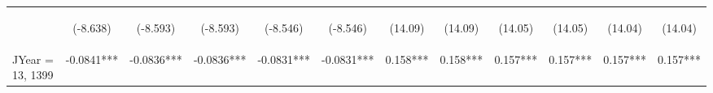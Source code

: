 \documentclass[]{article}
\begin{document}
\begin{center}
\begin{tabular}{lccccccccccc}
        \vspace{4pt}     & \begin{footnotesize}(-8.638)\end{footnotesize} & \begin{footnotesize}(-8.593)\end{footnotesize} & \begin{footnotesize}(-8.593)\end{footnotesize} & \begin{footnotesize}(-8.546)\end{footnotesize} & \begin{footnotesize}(-8.546)\end{footnotesize} & \begin{footnotesize}(14.09)\end{footnotesize}   & \begin{footnotesize}(14.09)\end{footnotesize}   & \begin{footnotesize}(14.05)\end{footnotesize}  & \begin{footnotesize}(14.05)\end{footnotesize}  & \begin{footnotesize}(14.04)\end{footnotesize}  & \begin{footnotesize}(14.04)\end{footnotesize}  \\
        JYear = 13, 1399 & -0.0841***                                     & -0.0836***                                     & -0.0836***                                     & -0.0831***                                     & -0.0831***                                     & 0.158***                                        & 0.158***                                        & 0.157***                                       & 0.157***                                       & 0.157***                                       & 0.157***                                       \\

\end{tabular}
\end{center}
\end{document}
